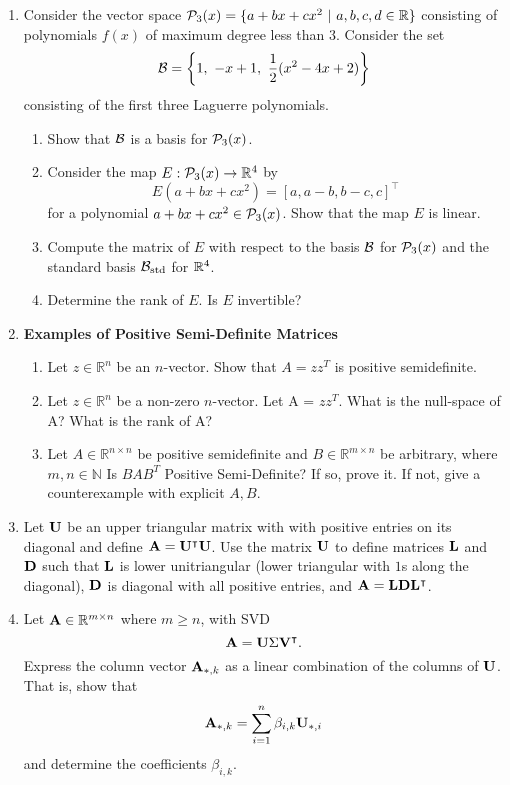\begin{enumerate}

    \item Consider the vector space $\CP_3(x) = \{a+bx+cx^2 \ | \ a,b,c,d\in\R\}$ consisting of polynomials $f(x)$ of maximum degree less than $3$. 
Consider the set $$\CB = \left\{1,\ -x+1,\ \frac{1}{2}(x^2-4x+2)\right\}$$
consisting of the first three Laguerre polynomials.
\begin{enumerate}
    \item Show that $\CB$ is a basis for $\CP_3(x)$. 
    \item Consider the map $E:\CP_3(x)\to\R^4$ by $$E(a+bx+cx^2) = [a, a-b, b-c,c]^\intercal$$
for a polynomial $a+bx+cx^2\in\CP_3(x)$. Show that the map $E$ is linear. 
\item Compute the matrix of $E$ with respect to the basis $\CB$ for $\CP_3(x)$ and the standard basis $\CB_\textnormal{std}$ for $\R^4$.
\item Determine the rank of $E$. Is $E$ invertible?
\end{enumerate}

\item \textbf{Examples of Positive Semi-Definite Matrices}

\begin{enumerate}
    \item Let $z \in \mathbb R^n$ be an $n$-vector. Show that $A = zz^T$ is positive semidefinite.
    \item Let $z \in \mathbb R^n$ be a non-zero $n$-vector. Let A = $zz^T$. What is the null-space of A? What is the rank of A?
    \item Let $A \in \mathbb R^{n \times n}$ be positive semidefinite and $B \in \mathbb R^{m \times n}$ be arbitrary, where $m, n \in \mathbb N$ Is $B A B^T$ Positive Semi-Definite? If so, prove it. If not, give a counterexample with explicit $A, B.$
\end{enumerate}



\item Let $\MU$ be an upper triangular matrix with with positive entries on its diagonal and define $\MA = \MU^\intercal\MU$. Use the matrix $\MU$ to define matrices $\ML$ and $\MD$ such that $\ML$ is lower unitriangular (lower triangular with $1$s along the diagonal), $\MD$ is diagonal with all positive entries, and $\MA = \ML\MD\ML^\intercal$. 

\item Let $\MA\in\mathbb{R}^{m\times n}$ where $m\geq n$, with SVD $$\MA=\MU\Sigma\MV^\intercal.$$
Express the column vector $\MA_{*,k}$ as a linear combination of the columns of $\MU$. That is, show that
$$\MA_{*,k}=\sum_{i=1}^n\beta_{i,k}\MU_{*,i}$$
and determine the coefficients $\beta_{i,k}$.
\end{enumerate}


